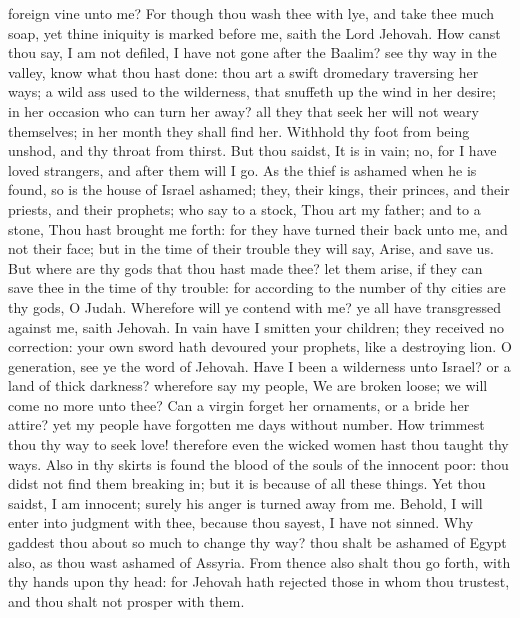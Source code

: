 foreign vine unto me? For though thou wash thee with lye, and take thee much soap, yet thine iniquity is marked before me, saith the Lord Jehovah. How canst thou say, I am not defiled, I have not gone after the Baalim? see thy way in the valley, know what thou hast done: thou art a swift dromedary traversing her ways; a wild ass used to the wilderness, that snuffeth up the wind in her desire; in her occasion who can turn her away? all they that seek her will not weary themselves; in her month they shall find her. Withhold thy foot from being unshod, and thy throat from thirst. But thou saidst, It is in vain; no, for I have loved strangers, and after them will I go.  As the thief is ashamed when he is found, so is the house of Israel ashamed; they, their kings, their princes, and their priests, and their prophets; who say to a stock, Thou art my father; and to a stone, Thou hast brought me forth: for they have turned their back unto me, and not their face; but in the time of their trouble they will say, Arise, and save us. But where are thy gods that thou hast made thee? let them arise, if they can save thee in the time of thy trouble: for according to the number of thy cities are thy gods, O Judah.  Wherefore will ye contend with me? ye all have transgressed against me, saith Jehovah. In vain have I smitten your children; they received no correction: your own sword hath devoured your prophets, like a destroying lion. O generation, see ye the word of Jehovah. Have I been a wilderness unto Israel? or a land of thick darkness? wherefore say my people, We are broken loose; we will come no more unto thee? Can a virgin forget her ornaments, or a bride her attire? yet my people have forgotten me days without number. How trimmest thou thy way to seek love! therefore even the wicked women hast thou taught thy ways. Also in thy skirts is found the blood of the souls of the innocent poor: thou didst not find them breaking in; but it is because of all these things. Yet thou saidst, I am innocent; surely his anger is turned away from me. Behold, I will enter into judgment with thee, because thou sayest, I have not sinned. Why gaddest thou about so much to change thy way? thou shalt be ashamed of Egypt also, as thou wast ashamed of Assyria. From thence also shalt thou go forth, with thy hands upon thy head: for Jehovah hath rejected those in whom thou trustest, and thou shalt not prosper with them. 

